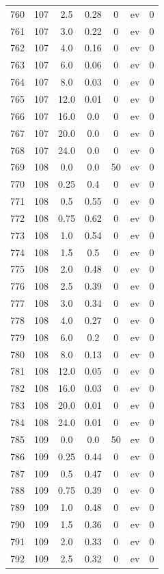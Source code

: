 \documentclass[12pt,a4paper]{article}
\begin{document}
\begin{tabular}{r|cccccc}
	760 & 107 & 2.5 & 0.28 & 0 & ev & 0 \\
	761 & 107 & 3.0 & 0.22 & 0 & ev & 0 \\
	762 & 107 & 4.0 & 0.16 & 0 & ev & 0 \\
	763 & 107 & 6.0 & 0.06 & 0 & ev & 0 \\
	764 & 107 & 8.0 & 0.03 & 0 & ev & 0 \\
	765 & 107 & 12.0 & 0.01 & 0 & ev & 0 \\
	766 & 107 & 16.0 & 0.0 & 0 & ev & 0 \\
	767 & 107 & 20.0 & 0.0 & 0 & ev & 0 \\
	768 & 107 & 24.0 & 0.0 & 0 & ev & 0 \\
	769 & 108 & 0.0 & 0.0 & 50 & ev & 0 \\
	770 & 108 & 0.25 & 0.4 & 0 & ev & 0 \\
	771 & 108 & 0.5 & 0.55 & 0 & ev & 0 \\
	772 & 108 & 0.75 & 0.62 & 0 & ev & 0 \\
	773 & 108 & 1.0 & 0.54 & 0 & ev & 0 \\
	774 & 108 & 1.5 & 0.5 & 0 & ev & 0 \\
	775 & 108 & 2.0 & 0.48 & 0 & ev & 0 \\
	776 & 108 & 2.5 & 0.39 & 0 & ev & 0 \\
	777 & 108 & 3.0 & 0.34 & 0 & ev & 0 \\
	778 & 108 & 4.0 & 0.27 & 0 & ev & 0 \\
	779 & 108 & 6.0 & 0.2 & 0 & ev & 0 \\
	780 & 108 & 8.0 & 0.13 & 0 & ev & 0 \\
	781 & 108 & 12.0 & 0.05 & 0 & ev & 0 \\
	782 & 108 & 16.0 & 0.03 & 0 & ev & 0 \\
	783 & 108 & 20.0 & 0.01 & 0 & ev & 0 \\
	784 & 108 & 24.0 & 0.01 & 0 & ev & 0 \\
	785 & 109 & 0.0 & 0.0 & 50 & ev & 0 \\
	786 & 109 & 0.25 & 0.44 & 0 & ev & 0 \\
	787 & 109 & 0.5 & 0.47 & 0 & ev & 0 \\
	788 & 109 & 0.75 & 0.39 & 0 & ev & 0 \\
	789 & 109 & 1.0 & 0.48 & 0 & ev & 0 \\
	790 & 109 & 1.5 & 0.36 & 0 & ev & 0 \\
	791 & 109 & 2.0 & 0.33 & 0 & ev & 0 \\
	792 & 109 & 2.5 & 0.32 & 0 & ev & 0 \\

\end{tabular}
\end{document}
